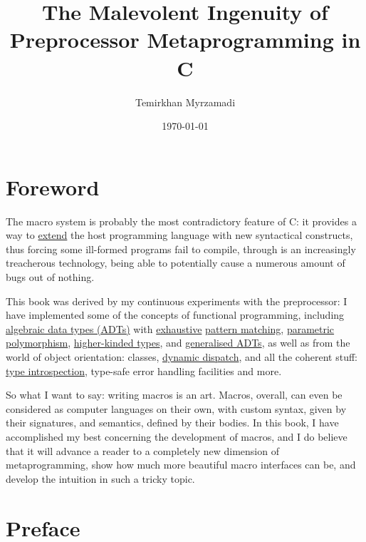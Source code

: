 \documentclass[a4paper, 12pt]{book}
\begin{document}
\title{The Malevolent Ingenuity of Preprocessor Metaprogramming in C}
\author{Temirkhan Myrzamadi}
\date{\today}
\maketitle

\tableofcontents

\newpage

\section{Foreword}

The macro system is probably the most contradictory feature of C: it provides a way to
\href{https://en.wikipedia.org/wiki/Extensible_programming}{extend} the host programming
language with new syntactical constructs, thus forcing some ill-formed programs fail
to compile, through is an increasingly treacherous technology, being able to potentially
cause a numerous amount of bugs out of nothing.

This book was derived by my continuous experiments with the preprocessor: I have implemented
some of the concepts of functional programming, including
\href{https://en.wikipedia.org/wiki/Algebraic_data_type}{algebraic data types (ADTs)} with
\href{https://en.wikipedia.org/wiki/Proof_by_exhaustion}{exhaustive}
\href{https://en.wikipedia.org/wiki/Pattern_matching}{pattern matching},
\href{https://en.wikipedia.org/wiki/Parametric_polymorphism}{parametric polymorphism},
\href{https://en.wikipedia.org/wiki/Kind_(type_theory)}{higher-kinded types}, and
\href{https://en.wikipedia.org/wiki/Generalized_algebraic_data_type}{generalised ADTs}, as
well as from the world of object orientation: classes,
\href{https://en.wikipedia.org/wiki/Dynamic_dispatch}{dynamic dispatch}, and all the coherent
stuff: \href{https://en.wikipedia.org/wiki/Type_introspection}{type introspection}, type-safe
error handling facilities and more.

So what I want to say: writing macros is an art. Macros, overall, can even be considered as
computer languages on their own, with custom syntax, given by their signatures, and
semantics, defined by their bodies. In this book, I have accomplished my best concerning
the development of macros, and I do believe that it will advance a reader to a completely
new dimension of metaprogramming, show how much more beautiful macro interfaces can be, and
develop the intuition in such a tricky topic.

\newpage

\section{Preface}
\end{document}
